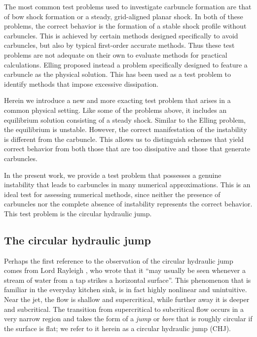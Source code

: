 \documentclass[preprint, 11pt]{article}
\begin{document}
The most common test problems used to investigate carbuncle formation are
that of bow shock formation or a steady, grid-aligned planar shock.
In both of these problems, the correct behavior is the formation of a stable
shock profile without carbuncles.  This is achieved by certain methods
designed specifically to avoid carbuncles, but also by typical first-order
accurate methods.  Thus these test problems are not adequate on their own to
evaluate methods for practical calculations.
Elling \cite{elling2009carbuncle} proposed instead a problem specifically
designed to feature a carbuncle as the physical solution.  This has
been used as a test problem to identify methods that impose excessive dissipation.

Herein we introduce a new and more exacting test problem that arises in a
common physical setting.  Like some
of the problems above, it includes an equilibrium solution consisting of a
steady shock.  Similar to the Elling problem, the equilibrium is unstable.
However, the correct manifestation of the instability is different from
the carbuncle.  This allows us to distinguish schemes that yield correct
behavior from both those that are too dissipative and those that generate
carbuncles.

In the present work, we provide a test problem that possesses a genuine instability
that leads to carbuncles in many numerical approximations.  This is an ideal
test for assessing numerical methods, since neither the presence of carbuncles
nor the complete absence of instability represents the correct behavior.
This test problem is the circular hydraulic jump.


\subsection{The circular hydraulic jump}

Perhaps the first reference to the observation of the circular hydraulic jump
comes from Lord Rayleigh \cite{rayleigh1914theory}, who wrote that it
``may usually be seen whenever a stream of water from a tap strikes a horizontal
surface''.  This phenomenon that is familiar in the everyday kitchen sink, is in
fact highly nonlinear and unintuitive.  Near the jet, the flow is shallow and
supercritical, while further away it is deeper and subcritical.  The transition from supercritical
to subcritical flow
occurs in a very narrow region and takes the form of a \emph{jump} or \emph{bore}
that is roughly circular if the surface is flat; we refer to it herein as a
circular hydraulic jump (CHJ).
\end{document}
